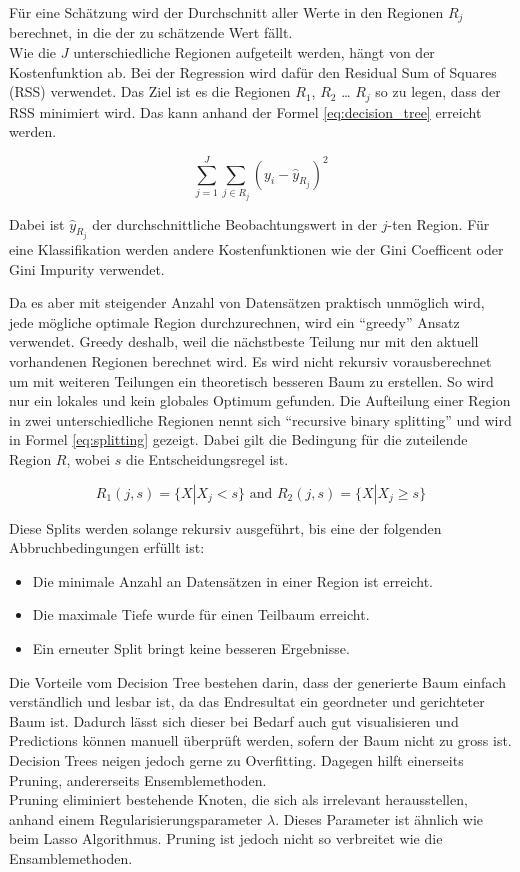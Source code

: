 Für eine Schätzung wird der Durchschnitt aller Werte in den Regionen $R_j$ berechnet, in die der zu schätzende Wert fällt.\\
Wie die  $J$ unterschiedliche Regionen aufgeteilt werden, hängt von der Kostenfunktion ab. Bei der Regression wird dafür den Residual Sum of Squares (RSS) verwendet. Das Ziel ist es die Regionen $R_1$, $R_2$ … $R_j$ so zu legen, dass der RSS minimiert wird. Das kann anhand der Formel \eqref{eq:decision_tree} erreicht werden.

\begin{equation}
\label{eq:decision_tree}
\sum_{j=1}^{J} \sum_{j \in R_j}^{} (y_i - \hat{y}_{R_j})^2
\end{equation}

Dabei ist $\hat{y}_{R_j}$ der durchschnittliche Beobachtungswert in der $j$-ten Region. Für eine Klassifikation werden andere Kostenfunktionen wie der Gini Coefficent oder Gini Impurity verwendet.

Da es aber mit steigender Anzahl von Datensätzen praktisch unmöglich wird, jede mögliche optimale Region durchzurechnen, wird ein “greedy” Ansatz verwendet. Greedy deshalb, weil die nächstbeste Teilung nur mit den aktuell vorhandenen Regionen berechnet wird. Es wird nicht rekursiv vorausberechnet um mit weiteren Teilungen ein theoretisch besseren Baum zu erstellen. So wird nur ein lokales und kein globales Optimum gefunden. Die Aufteilung einer Region in zwei unterschiedliche Regionen nennt sich “recursive binary splitting” und wird in Formel \eqref{eq:splitting} gezeigt. Dabei gilt die Bedingung für die zuteilende Region $R$, wobei $s$ die Entscheidungsregel ist.

\begin{equation}\label{eq:splitting}
R_1(j,s) = \{X|X_j < s\} \text{ and } R_2(j,s) = \{X|X_j \geq s\}
\end{equation}

Diese Splits werden solange rekursiv ausgeführt, bis eine der folgenden Abbruchbedingungen erfüllt ist:

\begin{itemize}
\item Die minimale Anzahl an Datensätzen in einer Region ist erreicht.
\item Die maximale Tiefe wurde für einen Teilbaum erreicht.
\item Ein erneuter Split bringt keine besseren Ergebnisse.
\end{itemize}

Die Vorteile vom Decision Tree bestehen darin, dass der generierte Baum einfach verständlich und lesbar ist, da das Endresultat ein geordneter und gerichteter Baum ist. Dadurch lässt sich dieser bei Bedarf auch gut visualisieren und Predictions können manuell überprüft werden, sofern der Baum nicht zu gross ist.\\
Decision Trees neigen jedoch gerne zu Overfitting. Dagegen hilft einerseits Pruning, andererseits Ensemblemethoden.\\
Pruning eliminiert bestehende Knoten, die sich als irrelevant herausstellen, anhand einem Regularisierungsparameter $\lambda$. Dieses Parameter ist ähnlich wie beim Lasso Algorithmus. Pruning ist jedoch nicht so verbreitet wie die Ensamblemethoden.


